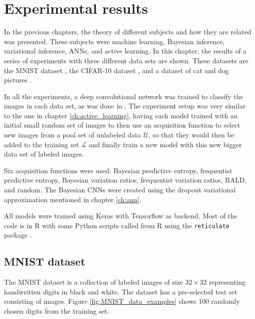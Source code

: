 
\chapter{Experimental results}
\label{ch:results}

In the previous chapters, the theory of different subjects and how they are related was presented. These subjects were machine learning, Bayesian inference, variational inference, ANNs, and active learning. In this chapter, the results of a series of experiments with three different data sets are shown. These datasets are the MNIST dataset \cite{lecun1998gradient}, the CIFAR-10 dataset \cite{krizhevsky2009learning}, and a dataset of cat and dog pictures \cite{elson2007asirra}.

In all the experiments, a deep convolutional network was trained to classify the images in each data set, as was done in \cite{Gal2016Active}. The experiment setup was very similar to the one in chapter \ref{ch:active_learning}, having each model trained with an initial small random set of images to then use an acquisition function to select new images from a pool set of unlabeled data $\mathcal{U}$, so that they would then be added to the training set $\mathcal{L}$ and finally train a new model with this new bigger data set of labeled images.

Six acquisition functions were used: Bayesian predictive entropy, frequentist predictive entropy, Bayesian variation ratios, frequentist variation ratios, BALD, and random. The Bayesian CNNs were created using the dropout variational approximation mentioned in chapter \ref{ch:ann}.

All models were trained using Keras\cite{chollet2015keras} with Tensorflow \cite{tensorflow2015-whitepaper} as backend. Most of the code is in R with some Python scripts called from R using the \texttt{reticulate} package \cite{reticulate_package}.

\section{MNIST dataset}

The MNIST dataset is a collection of  labeled images of size $32 \times 32$ representing handwritten digits in black and white. The dataset has a pre-selected test set consisting of  images. Figure \ref{fig:MNIST_data_examples} shows 100 randomly chosen digits from the training set.

